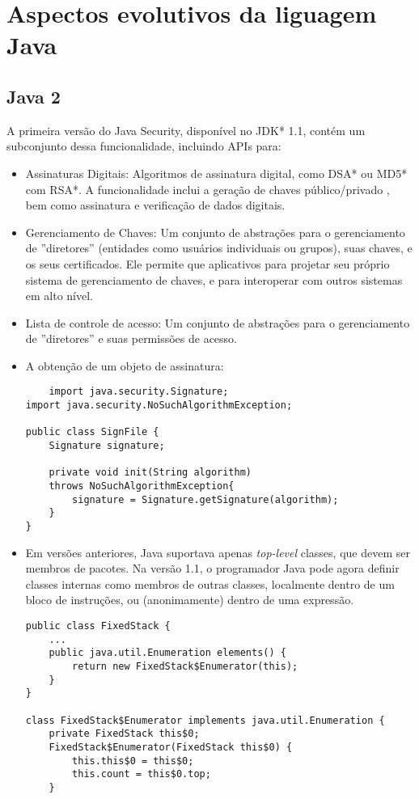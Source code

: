 \section {Aspectos evolutivos da liguagem Java}

\subsection {Java 2}
A primeira versão do Java Security, disponível no JDK* 1.1, contém um subconjunto dessa funcionalidade, incluindo APIs para:
  \begin{itemize}
  \item Assinaturas Digitais: Algoritmos de assinatura digital, como DSA* ou MD5* com RSA*. A funcionalidade inclui a geração de chaves público/privado , bem como assinatura e verificação de dados digitais.
  \item Gerenciamento de Chaves: Um conjunto de abstrações para o gerenciamento de ''diretores'' (entidades como usuários individuais ou grupos), suas chaves, e os seus certificados. Ele permite que aplicativos para projetar seu próprio sistema de gerenciamento de chaves, e para interoperar com outros sistemas em alto nível.
  \item Lista de controle de acesso: Um conjunto de abstrações para o gerenciamento de ''diretores'' e suas permissões de acesso.
  \item A obtenção de um objeto de assinatura: 
  \begin{lstlisting}
	import java.security.Signature;
import java.security.NoSuchAlgorithmException;

public class SignFile {
    Signature signature;

    private void init(String algorithm) 
    throws NoSuchAlgorithmException{
        signature = Signature.getSignature(algorithm);
    }
}
  \end{lstlisting}
  \item Em versões anteriores, Java suportava apenas {\it top-level} classes, que devem ser membros de pacotes. Na versão 1.1, o programador Java pode agora definir classes internas como membros de outras classes, localmente dentro de um bloco de instruções, ou (anonimamente) dentro de uma expressão.
  
\begin{lstlisting}
public class FixedStack {
    ...
    public java.util.Enumeration elements() {
        return new FixedStack$Enumerator(this);
    }
}

class FixedStack$Enumerator implements java.util.Enumeration {
    private FixedStack this$0;
    FixedStack$Enumerator(FixedStack this$0) {
        this.this$0 = this$0;
        this.count = this$0.top;
    }


\end{lstlisting}
\end{itemize}

